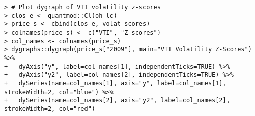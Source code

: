 \documentclass[10pt]{beamer}\usepackage[]{graphicx}\usepackage[]{color}
\makeatletter
\newenvironment{kframe}{%
 \def\at@end@of@kframe{}%
 \ifinner\ifhmode%
  \def\at@end@of@kframe{\end{minipage}}%
  \begin{minipage}{\columnwidth}%
 \fi\fi%
 \def\FrameCommand##1{\hskip\@totalleftmargin \hskip-\fboxsep
 \colorbox{shadecolor}{##1}\hskip-\fboxsep
     \hskip-\linewidth \hskip-\@totalleftmargin \hskip\columnwidth}%
 \MakeFramed {\advance\hsize-\width
   \@totalleftmargin\z@ \linewidth\hsize
   \@setminipage}}%
 {\par\unskip\endMakeFramed%
 \at@end@of@kframe}
\newenvironment{knitrout}{}{} %
\makeatother
\begin{document}
\begin{frame}[fragile,t]{\subsecname}
\begin{block}{}
\begin{columns}[T]
\begin{knitrout}
\begin{kframe}
\begin{verbatim}
> # Plot dygraph of VTI volatility z-scores
> clos_e <- quantmod::Cl(oh_lc)
> price_s <- cbind(clos_e, volat_scores)
> colnames(price_s) <- c("VTI", "Z-scores")
> col_names <- colnames(price_s)
> dygraphs::dygraph(price_s["2009"], main="VTI Volatility Z-Scores") %>%
+   dyAxis("y", label=col_names[1], independentTicks=TRUE) %>%
+   dyAxis("y2", label=col_names[2], independentTicks=TRUE) %>%
+   dySeries(name=col_names[1], axis="y", label=col_names[1], strokeWidth=2, col="blue") %>%
+   dySeries(name=col_names[2], axis="y2", label=col_names[2], strokeWidth=2, col="red")
\end{verbatim}
\end{kframe}
\end{knitrout}
  \end{columns}
\end{block}

\end{frame}


\end{document}
